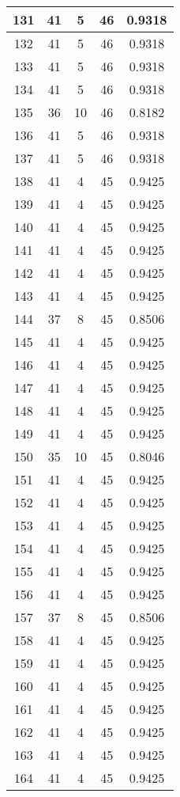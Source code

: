 \documentclass[letterpaper, 12pt]{article}
\begin{document}
\begin{longtable}{|c|c|c|c|c|}
\hline
131 & 41 & 5 & 46 & 0.9318 \\
\hline
132 & 41 & 5 & 46 & 0.9318 \\
\hline
133 & 41 & 5 & 46 & 0.9318 \\
\hline
134 & 41 & 5 & 46 & 0.9318 \\
\hline
135 & 36 & 10 & 46 & 0.8182 \\
\hline
136 & 41 & 5 & 46 & 0.9318 \\
\hline
137 & 41 & 5 & 46 & 0.9318 \\
\hline
138 & 41 & 4 & 45 & 0.9425 \\
\hline
139 & 41 & 4 & 45 & 0.9425 \\
\hline
140 & 41 & 4 & 45 & 0.9425 \\
\hline
141 & 41 & 4 & 45 & 0.9425 \\
\hline
142 & 41 & 4 & 45 & 0.9425 \\
\hline
143 & 41 & 4 & 45 & 0.9425 \\
\hline
144 & 37 & 8 & 45 & 0.8506 \\
\hline
145 & 41 & 4 & 45 & 0.9425 \\
\hline
146 & 41 & 4 & 45 & 0.9425 \\
\hline
147 & 41 & 4 & 45 & 0.9425 \\
\hline
148 & 41 & 4 & 45 & 0.9425 \\
\hline
149 & 41 & 4 & 45 & 0.9425 \\
\hline
150 & 35 & 10 & 45 & 0.8046 \\
\hline
151 & 41 & 4 & 45 & 0.9425 \\
\hline
152 & 41 & 4 & 45 & 0.9425 \\
\hline
153 & 41 & 4 & 45 & 0.9425 \\
\hline
154 & 41 & 4 & 45 & 0.9425 \\
\hline
155 & 41 & 4 & 45 & 0.9425 \\
\hline
156 & 41 & 4 & 45 & 0.9425 \\
\hline
157 & 37 & 8 & 45 & 0.8506 \\
\hline
158 & 41 & 4 & 45 & 0.9425 \\
\hline
159 & 41 & 4 & 45 & 0.9425 \\
\hline
160 & 41 & 4 & 45 & 0.9425 \\
\hline
161 & 41 & 4 & 45 & 0.9425 \\
\hline
162 & 41 & 4 & 45 & 0.9425 \\
\hline
163 & 41 & 4 & 45 & 0.9425 \\
\hline
164 & 41 & 4 & 45 & 0.9425 \\

\end{longtable}
\end{document}
